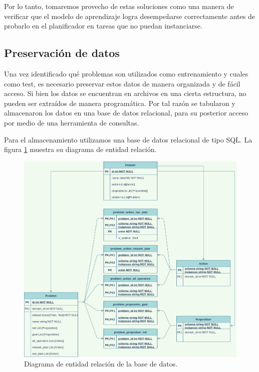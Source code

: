 Por lo tanto, tomaremos provecho de estas soluciones como una manera de
verificar que el modelo de aprendizaje logra desempeñarse correctamente antes de
probarlo en el planificador en tareas que no puedan instanciarse.

\subsection{Preservación de datos}

Una vez identificado qué problemas son utilizados como entrenamiento y cuales como
test, es necesario preservar estos datos de manera organizada y de fácil acceso.
Si bien los datos se encuentran en archivos en una cierta estructura, no pueden
ser extraídos de manera programática. Por tal razón se tabularon y almacenaron
los datos en una base de datos relacional, para su posterior acceso por medio de
una herramienta de consultas.

Para el almacenamiento utilizamos una base de datos relacional de tipo SQL. La
figura \ref{fig:ERD} muestra su diagrama de entidad relación.

\begin{figure}[t!]
    \centering
    \includegraphics[width=\linewidth]{figures/ERD.png}
    \caption{Diagrama de entidad relación de la base de datos.}
    \label{fig:ERD}
\end{figure}


